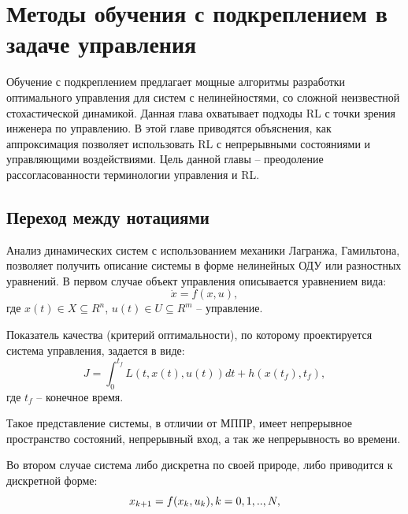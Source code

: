 \newpage
\chapter{Методы обучения с подкреплением в задаче управления} \label{ch2}
	

 
Обучение с подкреплением предлагает мощные алгоритмы разработки оптимального управления для систем с нелинейностями, со сложной неизвестной стохастической динамикой. Данная глава охватывает подходы RL с точки зрения инженера по управлению. В этой главе приводятся объяснения, как аппроксимация позволяет использовать RL с непрерывными состояниями и управляющими воздействиями.
Цель данной главы -- преодоление рассогласованности терминологии управления и RL.


\section{Переход между нотациями} \label{ch2:title-abbr} %

Анализ динамических систем с использованием механики Лагранжа, Гамильтона, позволяет получить описание системы в форме нелинейных ОДУ или разностных уравнений. В первом случае объект управления описывается уравнением вида: 
\begin{equation*}
	\dot x = f(x, u),
\end{equation*}
где  $x(t) \in X \subseteq R^n$, $u(t) \in U \subseteq R^m$ -- управление.

Показатель качества (критерий оптимальности), по которому проектируется система управления, задается в виде:
\begin{equation*}
	J=\int_{0}^{t_f} L(t, x(t), u(t))dt + h(x(t_f), t_f),
\end{equation*}
где $t_f$ -- конечное время.

Такое представление системы, в отличии от МППР, имеет непрерывное пространство состояний, непрерывный вход, а так же непрерывность во времени. 

Во втором случае система либо дискретна по своей природе, либо приводится к дискретной форме: 
\begin{equation*}
x_{k+1} = f(x_k, u_k), \space  k=0, 1,.., N,
\end{equation*}

